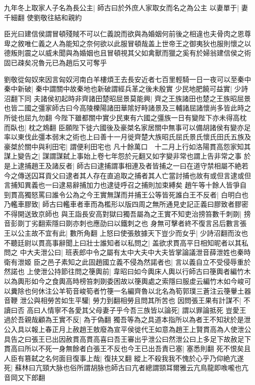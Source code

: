 九年冬上取家人子名為長公主|{
	師古曰於外庶人家取女而名之為公主}
以妻單于|{
	妻千細翻}
使劉敬往結和親約

臣光曰建信侯謂冒頓殘賊不可以仁義說而欲與為婚姻何前後之相違也夫骨肉之恩尊卑之敘唯仁義之人為能知之奈何欲以此服冒頓哉盖上世帝王之御夷狄也服則懷之以德叛則震之以威未聞與為婚姻也且冒頓視其父如禽獸而獵之奚有於婦翁建信侯之術固已疎矣况魯元已為趙后又可奪乎

劉敬從匈奴來因言匈奴河南白羊樓煩王去長安近者七百里輕騎一日一夜可以至秦中秦中新破|{
	秦中謂關中故秦地也新破謂經兵革之後未殷實}
少民地肥饒可益實|{
	少詩沼翻下同}
夫諸侯初起時非齊諸田楚昭屈景莫能興|{
	齊之王族諸田也楚之王族昭屈景也皆二國之彊家師古曰今高陵櫟陽諸田華隂好畤諸景及三輔諸屈諸懷尚多皆此時之所徙也屈九勿翻}
今陛下雖都關中實少民東有六國之彊族一日有變陛下亦未得高枕而臥也|{
	枕之鴆翻}
臣願陛下徙六國後及豪桀名家居關中無事可以備胡諸侯有變亦足率以東伐此彊本弱末之術也上曰善十一月徙齊楚大族昭氏屈氏景氏懷氏田氏五族及豪桀於關中與利田宅|{
	謂便利田宅也}
凡十餘萬口　十二月上行如洛陽貫高怨家知其謀上變告之|{
	謀謂謀弑上事始上卷七年怨於元翻又如字變非常也謂上告非常之事}
於是上逮捕趙王及諸反者|{
	師古曰逮捕謂事相連及者皆捕之一曰在道守禁相屬不絶若今之傳送囚耳貢父曰逮者其人存在直追取之捕者其人亡當討捕也故有或但言逮或但言捕知異義也一曰逮易辭捕加力也逮徒呼召之捕則加束縛矣}
趙午等十餘人皆爭自剄貫高獨怒罵曰誰令公為之今王實無謀而并捕王公等皆死誰白王不反者|{
	白明白也}
乃轞車膠致|{
	師古曰轞車者車而為檻形以版四周之無所通見史記正義曰膠致者膠密不得開送致京師也}
與王詣長安高對獄曰獨吾屬為之王實不知吏治搒笞數千刺剟|{
	搒音彭剟丁劣翻索隱曰剟亦刺也應劭曰以鐵刺之也}
身無可擊者終不復言呂后數言張王以公主故不宜有此|{
	數所角翻}
上怒曰使張敖據天下豈少而女乎|{
	少詩沼翻而汝也}
不聽廷尉以貫高事辭聞上曰壯士誰知者以私問之|{
	盖欲求貫高平日相知昵者以其私問之}
中大夫泄公曰|{
	班表郎中令之屬有太中大夫中大夫皆掌論議泄音薛泄姓也秦時衛有泄姬}
臣之邑子素知之此固趙國立義不侵為然諾者也|{
	言以義自立不受侵辱重於然諾也}
上使泄公持節往問之箯輿前|{
	韋昭曰如今輿床人輿以行師古曰箯輿者編竹木以為輿形如今之食輿高時榜笞刺剟委困故以箯輿處之索隱曰服䖍云編竹木如今峻可以糞除也何休注公羊筍音峻筍者竹箯一名編齊魯以北名為筍郭璞三蒼注云箯轝土器音鞭}
泄公與相勞苦如生平驩|{
	勞力到翻相勞且問其所苦也}
因問張王果有計謀不|{
	不讀曰否}
高曰人情寧不各愛其父母妻子乎今吾三族皆以論死|{
	謂以罪論抵死}
豈愛王過於吾親哉顧為王實不反|{
	為于偽翻}
獨吾等為之具道本指所以為者王不知狀於是泄公入具以報上春正月上赦趙王敖廢為宣平侯徙代王如意為趙王上賢貫高為人使泄公具告之曰張王已出因赦貫高貫高喜曰吾王審出乎泄公曰然泄公曰上多足下故赦足下貫高曰所以不死一身無餘者白張王不反也今王已出吾責已塞|{
	塞悉則翻}
死不恨矣且人臣有篡弑之名何面目復事上哉|{
	復扶又翻}
縱上不殺我我不愧於心乎乃仰絶亢遂死|{
	蘇林曰亢頸大脉也俗所謂胡脉也師古曰亢者總謂頸耳爾雅云亢鳥龍即㗋嚨也亢音岡又下郎翻}


